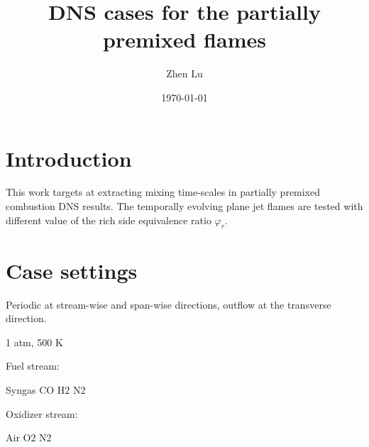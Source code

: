 \documentclass[11pt]{article}
\title{DNS cases for the partially premixed flames}
\date{\today}
\author{Zhen Lu}
\begin{document}
\section{Introduction}

This work targets at extracting mixing time-scales in partially premixed combustion DNS results. The temporally evolving plane jet flames are tested with different value of the rich side equivalence ratio $\varphi_r$.

\section{Case settings}

Periodic at stream-wise and span-wise directions, outflow at the transverse direction.

1 atm, 500 K

Fuel stream:

Syngas CO H2 N2

Oxidizer stream:

Air O2 N2
\end{document}
